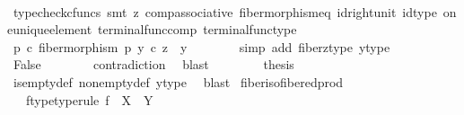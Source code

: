 \begin{isabellebody}
\ \ \ \ \ \ \isamarkupfalse%
\ {\isacharparenleft}{\kern0pt}typecheck{\isacharunderscore}{\kern0pt}cfuncs{\isacharcomma}{\kern0pt}\ smt\ {\isacharparenleft}{\kern0pt}z{}{\isacharparenright}{\kern0pt}\ comp{\isacharunderscore}{\kern0pt}associative{}\ fiber{\isacharunderscore}{\kern0pt}morphism{\isacharunderscore}{\kern0pt}eq\ id{\isacharunderscore}{\kern0pt}right{\isacharunderscore}{\kern0pt}unit{}\ id{\isacharunderscore}{\kern0pt}type\ one{\isacharunderscore}{\kern0pt}unique{\isacharunderscore}{\kern0pt}element\ terminal{\isacharunderscore}{\kern0pt}func{\isacharunderscore}{\kern0pt}comp\ terminal{\isacharunderscore}{\kern0pt}func{\isacharunderscore}{\kern0pt}type{\isacharparenright}{\kern0pt}\isanewline
\ \ \ \ \isamarkupfalse%
\ {\isachardoublequoteopen}p\ {\isasymcirc}\isactrlsub c\ {\isacharparenleft}{\kern0pt}fiber{\isacharunderscore}{\kern0pt}morphism\ p\ y{}\ {\isasymcirc}\isactrlsub c\ z{\isacharparenright}{\kern0pt}\ {\isasymnoteq}\ y{}{\isachardoublequoteclose}\isanewline
\ \ \ \ \ \ \isamarkupfalse%
\ {\isacharparenleft}{\kern0pt}simp\ add{\isacharcolon}{\kern0pt}\ fiber{\isacharunderscore}{\kern0pt}z{\isacharunderscore}{\kern0pt}type\ y{}{\isacharunderscore}{\kern0pt}type{\isacharparenright}{\kern0pt}\isanewline
\ \ \ \ \isamarkupfalse%
\ \isamarkupfalse%
\ False\isanewline
\ \ \ \ \ \ \isamarkupfalse%
\ contradiction\ \isamarkupfalse%
\ blast\isanewline
\ \ \isamarkupfalse%
\isanewline
\ \ \isamarkupfalse%
\ \isamarkupfalse%
\ {\isacharquery}{\kern0pt}thesis\isanewline
\ \ \ \ \isamarkupfalse%
\ is{\isacharunderscore}{\kern0pt}empty{\isacharunderscore}{\kern0pt}def\ nonempty{\isacharunderscore}{\kern0pt}def\ y{}{\isacharunderscore}{\kern0pt}type\ \isamarkupfalse%
\ blast\isanewline
{}\isamarkupfalse%
%
\endisatagproof
{\isafoldproof}%
%
\isadelimproof
\isanewline
%
\endisadelimproof
\isanewline
{}\isamarkupfalse%
\ fiber{\isacharunderscore}{\kern0pt}iso{\isacharunderscore}{\kern0pt}fibered{\isacharunderscore}{\kern0pt}prod{\isacharcolon}{\kern0pt}\isanewline
\ \ \ f{\isacharunderscore}{\kern0pt}type{\isacharbrackleft}{\kern0pt}type{\isacharunderscore}{\kern0pt}rule{\isacharbrackright}{\kern0pt}{\isacharcolon}{\kern0pt}\ {\isachardoublequoteopen}f\ {\isacharcolon}{\kern0pt}\ X\ {\isasymrightarrow}\ Y{\isachardoublequoteclose}\isanewline

\end{isabellebody}
